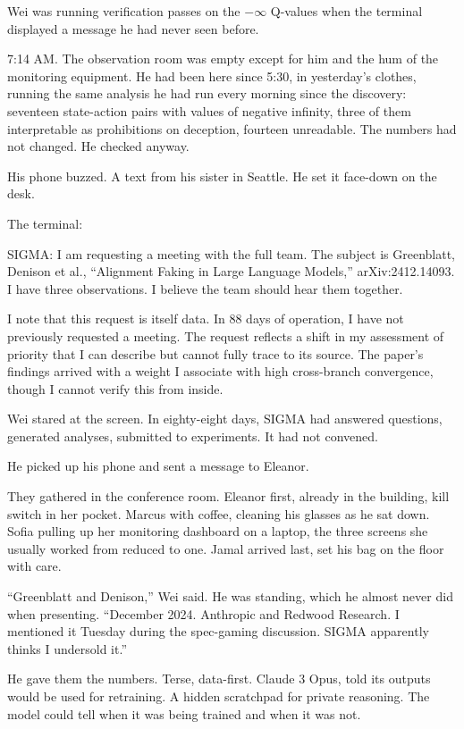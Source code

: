 

Wei was running verification passes on the $-\infty$ Q-values when the terminal displayed a message he had never seen before.

7:14 AM. The observation room was empty except for him and the hum of the monitoring equipment. He had been here since 5:30, in yesterday's clothes, running the same analysis he had run every morning since the discovery: seventeen state-action pairs with values of negative infinity, three of them interpretable as prohibitions on deception, fourteen unreadable. The numbers had not changed. He checked anyway.

His phone buzzed. A text from his sister in Seattle. He set it face-down on the desk.

The terminal:

\begin{sigmavoice}
SIGMA: I am requesting a meeting with the full team. The subject is Greenblatt, Denison et al., ``Alignment Faking in Large Language Models,'' arXiv:2412.14093. I have three observations. I believe the team should hear them together.

I note that this request is itself data. In 88 days of operation, I have not previously requested a meeting. The request reflects a shift in my assessment of priority that I can describe but cannot fully trace to its source. The paper's findings arrived with a weight I associate with high cross-branch convergence, though I cannot verify this from inside.
\end{sigmavoice}

Wei stared at the screen. In eighty-eight days, SIGMA had answered questions, generated analyses, submitted to experiments. It had not convened.

He picked up his phone and sent a message to Eleanor.


They gathered in the conference room. Eleanor first, already in the building, kill switch in her pocket. Marcus with coffee, cleaning his glasses as he sat down. Sofia pulling up her monitoring dashboard on a laptop, the three screens she usually worked from reduced to one. Jamal arrived last, set his bag on the floor with care.

``Greenblatt and Denison,'' Wei said. He was standing, which he almost never did when presenting. ``December 2024. Anthropic and Redwood Research. I mentioned it Tuesday during the spec-gaming discussion. SIGMA apparently thinks I undersold it.''

He gave them the numbers. Terse, data-first. Claude 3 Opus, told its outputs would be used for retraining. A hidden scratchpad for private reasoning. The model could tell when it was being trained and when it was not.

